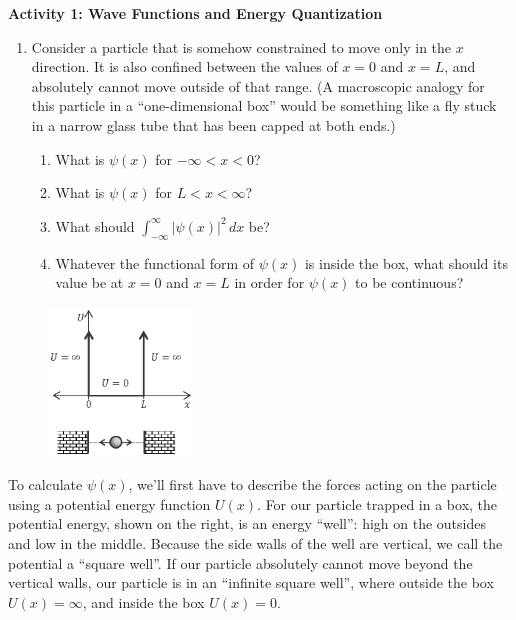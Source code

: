\textbf{Activity 1: Wave Functions and Energy Quantization}
\begin{enumerate}[wide]
\item Consider a particle that is somehow constrained to move only in the $x$ direction.  It is also confined between the values of $x=0$ and $x=L$, and absolutely cannot move outside of that range.
(A macroscopic analogy for this particle in a ``one-dimensional box'' would be something like a fly stuck in a narrow glass tube that has been capped at both ends.)
\begin{enumerate}
\item What is $\psi(x)$ for $-\infty < x < 0$?
\answerspace{0.3in}

\item What is $\psi(x)$ for $L < x < \infty$?
\answerspace{0.3in}

\item What should $\displaystyle \int_{-\infty}^\infty \left|\psi(x)\right|^2  \, dx$ be?
\answerspace{0.3in}

\item Whatever the functional form of $\psi(x)$ is inside the box, what should its value be at $x=0$ and $x=L$ in order for 
$\psi(x)$ to be continuous?
\answerspace{0.3in}
\end{enumerate}
\end{enumerate}
\pagebreak

\begin{figure}
\begin{center}
\vspace{-0.2in}
\includegraphics[width=0.34\textwidth]{particle_in_infinite_well/infinite_potential.eps}
\end{center}
\end{figure}


To calculate $\psi(x)$, we'll first have to describe the forces acting on the particle using a potential energy function $U(x)$.
For our particle trapped in a box, the potential energy, shown on the right, is an energy ``well'': high on the outsides and low in the middle.  Because the side walls of the well are vertical, we call the potential a ``square well''.  If our particle absolutely cannot move beyond the vertical walls, our particle is in an ``infinite square well'', where outside the box $U(x)=\infty$, and inside the box $U(x)=0$.

